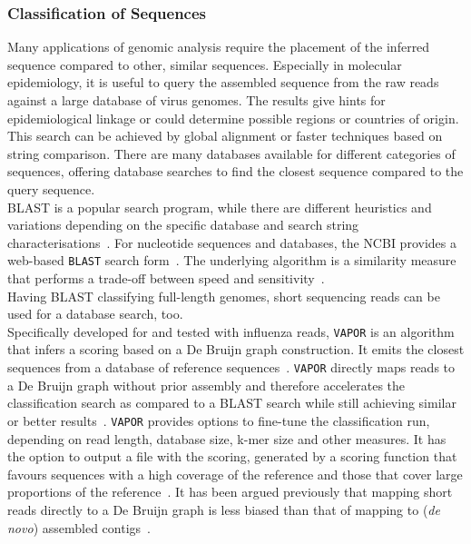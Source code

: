 \subsubsection*{Classification of Sequences}
Many applications of genomic analysis require the placement of the inferred sequence compared to other, similar sequences. Especially in molecular epidemiology, it is useful to query the assembled sequence from the raw reads against a large database of virus genomes. The results give hints for epidemiological linkage or could determine possible regions or countries of origin. This search can be achieved by global alignment or faster techniques based on string comparison. There are many databases available for different categories of sequences, offering database searches to find the closest sequence compared to the query sequence. \\
\ac{BLAST} is a popular search program, while there are different heuristics and variations depending on the specific database and search string characterisations~\cite{altschul1990basic}. For nucleotide sequences and databases, the \ac{NCBI} provides a web-based \texttt{\ac{BLAST}} search form~\cite{johnson2008ncbi, altschul1997gapped}. The underlying algorithm is a similarity measure that performs a trade-off between speed and sensitivity~\cite{altschul1997gapped}. \\
Having \ac{BLAST} classifying full-length genomes, short sequencing reads can be used for a database search, too.\\
Specifically developed for and tested with influenza reads, \texttt{VAPOR} is an algorithm that infers a scoring based on a De Bruijn graph construction. It emits the closest sequences from a database of reference sequences~\cite{southgate2020influenza}. \texttt{VAPOR} directly maps reads to a De Bruijn graph without prior assembly and therefore accelerates the classification search as compared to a \ac{BLAST} search while still achieving similar or better results~\cite{southgate2020influenza}. \texttt{VAPOR} provides options to fine-tune the classification run, depending on read length, database size, k-mer size and other measures. It has the option to output a file with the scoring, generated by a scoring function that favours sequences with a high coverage of the reference and those that cover large proportions of the reference~\cite{southgate2020influenza}. It has been argued previously that mapping short reads directly to a De Bruijn graph is less biased than that of mapping to (\textit{de novo}) assembled contigs~\cite{limasset2016read}.

